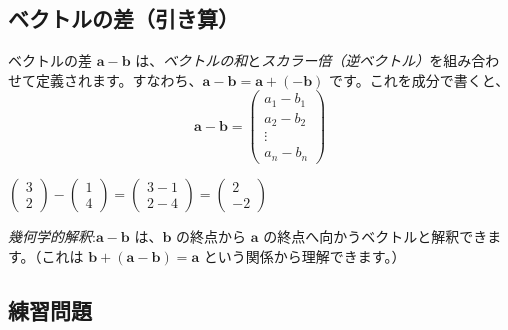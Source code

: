 \subsection{ベクトルの差（引き算）}

ベクトルの差 $\bm{a} - \bm{b}$ は、\emph{ベクトルの和}と\emph{スカラー倍（逆ベクトル）}を組み合わせて定義されます。すなわち、$\bm{a} - \bm{b} = \bm{a} + (-\bm{b})$ です。これを成分で書くと、
\[\bm{a} - \bm{b} = \begin{pmatrix} a_1 - b_1 \\ a_2 - b_2 \\ \vdots \\ a_n - b_n \end{pmatrix}\]

\begin{ex}
$\begin{pmatrix} 3 \\ 2 \end{pmatrix} - \begin{pmatrix} 1 \\ 4 \end{pmatrix} = \begin{pmatrix} 3 - 1 \\ 2 - 4 \end{pmatrix} = \begin{pmatrix} 2 \\ -2 \end{pmatrix}$
\end{ex}

\emph{幾何学的解釈}:$\bm{a} - \bm{b}$ は、$\bm{b}$ の終点から $\bm{a}$ の終点へ向かうベクトルと解釈できます。（これは $\bm{b} + (\bm{a} - \bm{b}) = \bm{a}$ という関係から理解できます。）

\subsection{練習問題}

